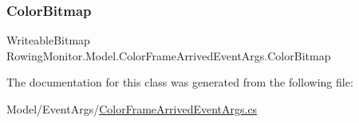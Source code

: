 \subsubsection{\texorpdfstring{Color\+Bitmap}{ColorBitmap}}
{\footnotesize\ttfamily Writeable\+Bitmap Rowing\+Monitor.\+Model.\+Color\+Frame\+Arrived\+Event\+Args.\+Color\+Bitmap\hspace{0.3cm}{\ttfamily [get]}}



The documentation for this class was generated from the following file\+:\begin{DoxyCompactItemize}
\item 
Model/\+Event\+Args/\hyperlink{_color_frame_arrived_event_args_8cs}{Color\+Frame\+Arrived\+Event\+Args.\+cs}\end{DoxyCompactItemize}
